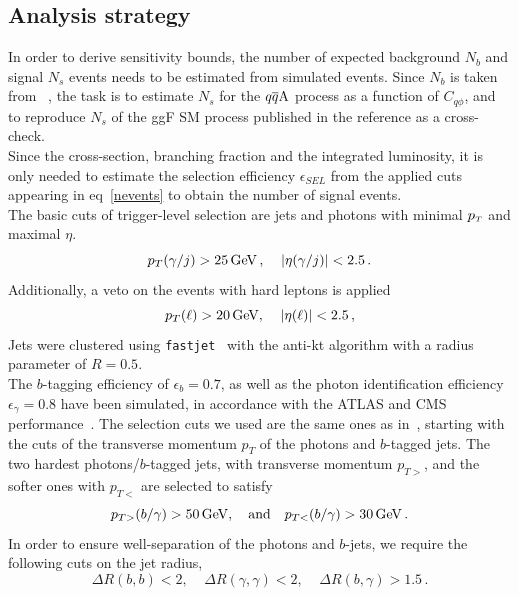 \subsection{Analysis strategy}
In order to derive sensitivity bounds, the number of expected background $N_b$ and signal $N_s$ events needs to be estimated from simulated events. Since  $N_b$ is  taken from ~\cite{Azatov:2015oxa}, the task is to estimate $N_s$ for the $q\overline q \rm A$ process as a function of $C_{q\phi}$, and to reproduce $N_s$ of the ggF SM process published in the reference as a cross-check.\\ 
Since the cross-section, branching fraction and the integrated luminosity, it is only needed to estimate the selection efficiency $\epsilon_{SEL}$ from the applied cuts appearing in eq~\eqref{nevents} to obtain the number of signal events.\\
The basic cuts of trigger-level selection are jets and photons with minimal $p_{\scriptscriptstyle T}$ and maximal $\eta$.
\begin{equation}
	p_T(\gamma/j) > 25 \, \GeV\,, \; \; \; \; |\eta(\gamma/j)| < 2.5\,.
	\label{tricut1}
\end{equation}
Additionally, a veto on the events with hard leptons is applied  
\begin{equation}
	p_T(\ell) > 20 \, \GeV, \; \; \; \; |\eta(\ell)| < 2.5\,,
		\label{tricut2}
\end{equation}
Jets were clustered using \texttt{fastjet}~\cite{Cacciari:2011ma} with the anti-kt algorithm with a radius parameter of $R=0.5$. \\
The $b$-tagging efficiency of $ \epsilon_b = 0.7$, as well as the photon identification efficiency~$ \epsilon_\gamma = 0.8$ have been simulated, in accordance with the ATLAS and CMS performance~\cite{Chatrchyan:2012dk,CMS:2013vea,ATL-PHYS-PUB-2013-009,ATL-PHYS-PUB-2013-009,CMS:2013aoa}.
The selection cuts we used are the same ones as in~\cite{Azatov:2015oxa}, starting with the cuts of the transverse momentum $p_T$ of the photons and $b$-tagged jets. The two hardest photons/$b$-tagged jets,  with transverse momentum $p_{T>}$, and the softer ones with $p_{T<}$ are selected to satisfy
\begin{equation}
	p_{T>}(b/ \gamma) > 50 \, \GeV, \quad \text{and} \quad   p_{T<}(b/ \gamma) > 30 \, \GeV\,.
	\label{cut1}
\end{equation}
In order to ensure well-separation of the photons and $b$-jets, we require the following cuts on the jet radius,
\begin{equation}
	\Delta R(b,b) < 2  ,\; \; \; \; \Delta R(\gamma,\gamma) < 2, \; \;  \; \; \Delta R(b,\gamma) > 1.5\,.
	\label{cut2}
\end{equation}
